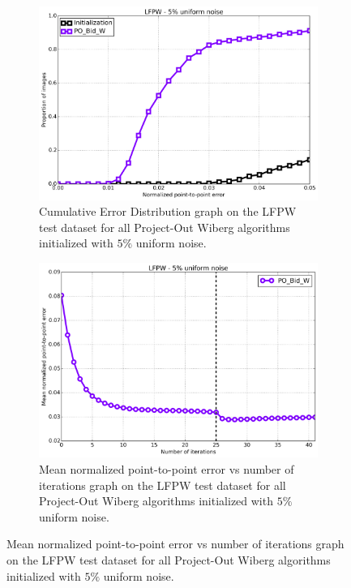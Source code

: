 \begin{figure}[p]
	\centering
	\begin{subfigure}{0.48\textwidth}
	    \includegraphics[width=\textwidth]{experiments/algorithms/po_w/ced_po_w_5.png}
	    \caption{Cumulative Error Distribution graph on the LFPW test dataset for all Project-Out Wiberg algorithms initialized with $5\%$ uniform noise.}
	    \label{fig:ced_po_w_5}
	\end{subfigure}
	\hfill
	\begin{subfigure}{0.48\textwidth}
	    \includegraphics[width=\textwidth]{experiments/algorithms/po_w/mean_error_vs_iters_po_w_5.png}
	    \caption{Mean normalized point-to-point error vs number of iterations graph on the LFPW test dataset for all Project-Out Wiberg algorithms initialized with $5\%$ uniform noise.}
	    \label{fig:mean_error_vs_iters_po_w_5}

\end{subfigure}
\end{figure}
